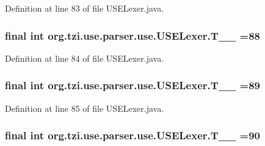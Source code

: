 Definition at line 83 of file U\-S\-E\-Lexer.\-java.

\hypertarget{classorg_1_1tzi_1_1use_1_1parser_1_1use_1_1_u_s_e_lexer_af564e73e641c927375c4e44f797fac0a}{
\subsubsection[{T\-\_\-\-\_\-88}]{\setlength{\rightskip}{0pt plus 5cm}final int org.\-tzi.\-use.\-parser.\-use.\-U\-S\-E\-Lexer.\-T\-\_\-\-\_ =88\hspace{0.3cm}{\ttfamily [static]}}}\label{classorg_1_1tzi_1_1use_1_1parser_1_1use_1_1_u_s_e_lexer_af564e73e641c927375c4e44f797fac0a}


Definition at line 84 of file U\-S\-E\-Lexer.\-java.

\hypertarget{classorg_1_1tzi_1_1use_1_1parser_1_1use_1_1_u_s_e_lexer_a4767fc193a630333b4aa4d7b2b5201ea}{
\subsubsection[{T\-\_\-\-\_\-89}]{\setlength{\rightskip}{0pt plus 5cm}final int org.\-tzi.\-use.\-parser.\-use.\-U\-S\-E\-Lexer.\-T\-\_\-\-\_ =89\hspace{0.3cm}{\ttfamily [static]}}}\label{classorg_1_1tzi_1_1use_1_1parser_1_1use_1_1_u_s_e_lexer_a4767fc193a630333b4aa4d7b2b5201ea}


Definition at line 85 of file U\-S\-E\-Lexer.\-java.

\hypertarget{classorg_1_1tzi_1_1use_1_1parser_1_1use_1_1_u_s_e_lexer_a0538f1883c3de12c16c17305c7203261}{
\subsubsection[{T\-\_\-\-\_\-90}]{\setlength{\rightskip}{0pt plus 5cm}final int org.\-tzi.\-use.\-parser.\-use.\-U\-S\-E\-Lexer.\-T\-\_\-\-\_ =90\hspace{0.3cm}{\ttfamily [static]}}}\label{classorg_1_1tzi_1_1use_1_1parser_1_1use_1_1_u_s_e_lexer_a0538f1883c3de12c16c17305c7203261}


